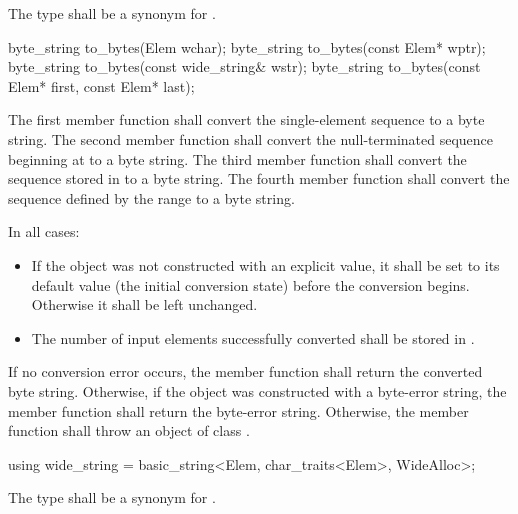 \begin{itemdescr}
\pnum
The type shall be a synonym for .
\end{itemdescr}

%
\begin{itemdecl}
byte_string to_bytes(Elem wchar);
byte_string to_bytes(const Elem* wptr);
byte_string to_bytes(const wide_string& wstr);
byte_string to_bytes(const Elem* first, const Elem* last);
\end{itemdecl}

\begin{itemdescr}
\pnum
\effects
The first member function shall convert the single-element sequence  to a byte string.
The second member function shall convert the null-terminated sequence beginning at  to
a byte string. The third member function shall convert the sequence stored in  to a
byte string. The fourth member function shall convert the sequence defined by the
range  to a byte string.

\pnum
In all cases:
\begin{itemize}
\item If the  object was not constructed with an explicit value, it
shall be
set to its default value (the initial conversion state) before the
conversion begins. Otherwise it shall be left unchanged.
\item The number of input elements successfully converted shall be stored
in .
\end{itemize}

\pnum
\returns
If no conversion error occurs, the member function shall return the converted byte string.
Otherwise, if the object was constructed with a byte-error string, the
member function shall return the byte-error string.
Otherwise, the member function shall throw an object of class .
\end{itemdescr}

%
\begin{itemdecl}
using wide_string = basic_string<Elem, char_traits<Elem>, WideAlloc>;
\end{itemdecl}

\begin{itemdescr}
\pnum
The type shall be a synonym for .
\end{itemdescr}

